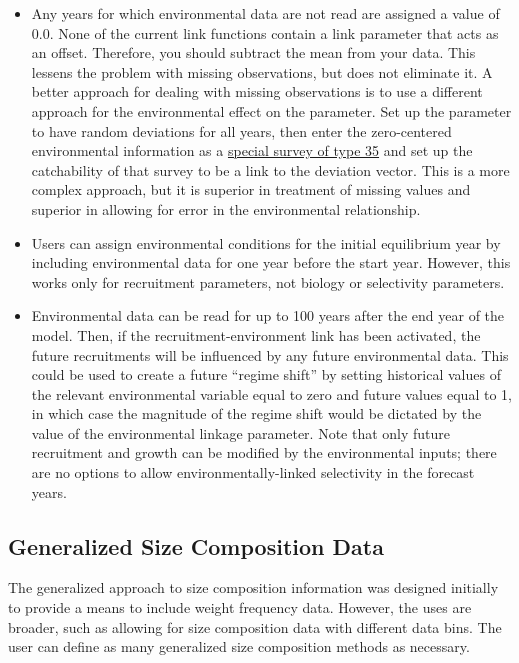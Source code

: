 	\begin{itemize}
		\item Any years for which environmental data are not read are assigned a value of 0.0. None of the current link functions contain a link parameter that acts as an offset.  Therefore, you should subtract the mean from your data. This lessens the problem with missing observations, but does not eliminate it. A better approach for dealing with missing observations is to use a different approach for the environmental effect on the parameter.  Set up the parameter to have random deviations for all years, then enter the zero-centered environmental information as a \hyperlink{SpecialSurvey}{special survey of type 35} and set up the catchability of that survey to be a link to the deviation vector.  This is a more complex approach, but it is superior in treatment of missing values and superior in allowing for error in the environmental relationship.
		\item Users can assign environmental conditions for the initial equilibrium year by including environmental data for one year before the start year. However, this works only for recruitment parameters, not biology or selectivity parameters.
		\item Environmental data can be read for up to 100 years after the end year of the model. Then, if the recruitment-environment link has been activated, the future recruitments will be influenced by any future environmental data. This could be used to create a future ``regime shift'' by setting historical values of the relevant environmental variable equal to zero and future values equal to 1, in which case the magnitude of the regime shift would be dictated by the value of the environmental linkage parameter. Note that only future recruitment and growth can be modified by the environmental inputs; there are no options to allow environmentally-linked selectivity in the forecast years.
	\end{itemize}

\subsection{Generalized Size Composition Data}
The generalized approach to size composition information was designed initially to provide a means to include weight frequency data. However, the uses are broader, such as allowing for size composition data with different data bins. The user can define as many generalized size composition methods as necessary.

